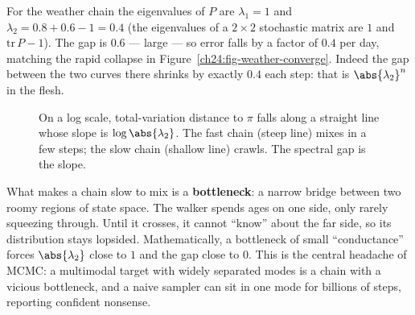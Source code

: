 For the weather chain the eigenvalues of $P$ are $\lambda_1 = 1$ and
$\lambda_2 = 0.8 + 0.6 - 1 = 0.4$ (the eigenvalues of a $2\times2$ stochastic
matrix are $1$ and $\mathrm{tr}\,P - 1$). The gap is $0.6$ --- large --- so error
falls by a factor of $0.4$ per day, matching the rapid collapse in
Figure~\ref{ch24:fig-weather-converge}. Indeed the gap between the two curves
there shrinks by exactly $0.4$ each step: that is $\abs{\lambda_2}^n$ in the flesh.

\begin{figure}[H]
  \centering
  \caption{On a log scale, total-variation distance to $\pi$ falls along a
  straight line whose slope is $\log\abs{\lambda_2}$. The fast chain (steep line)
  mixes in a few steps; the slow chain (shallow line) crawls. The spectral gap is
  the slope.}
  \label{ch24:fig-mixing-rate}
\end{figure}

\begin{intuitionbox}
What makes a chain slow to mix is a \textbf{bottleneck}: a narrow bridge between
two roomy regions of state space. The walker spends ages on one side, only rarely
squeezing through. Until it crosses, it cannot ``know'' about the far side, so its
distribution stays lopsided. Mathematically, a bottleneck of small ``conductance''
forces $\abs{\lambda_2}$ close to $1$ and the gap close to $0$. This is the
central headache of MCMC: a multimodal target with widely separated modes is a
chain with a vicious bottleneck, and a naive sampler can sit in one mode for
billions of steps, reporting confident nonsense.
\end{intuitionbox}

